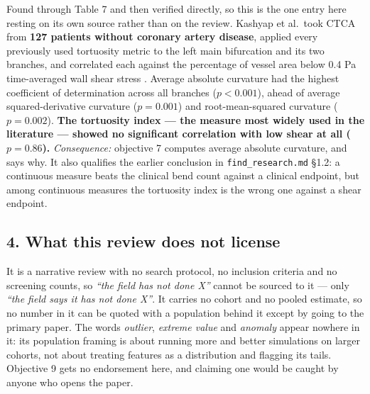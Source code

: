 Found through Table 7 and then verified directly, so this is the one entry here resting on its own
source rather than on the review. Kashyap et al.\ took CTCA from \textbf{127 patients without coronary
artery disease}, applied every previously used tortuosity metric to the left main bifurcation and
its two branches, and correlated each against the percentage of vessel area below 0.4 Pa
time-averaged wall shear stress \cite{kashyap2022tortuosity}.
Average absolute curvature had the highest coefficient of determination across all branches
($p < 0.001$), ahead of average squared-derivative curvature ($p = 0.001$) and root-mean-squared
curvature ($p = 0.002$).
\textbf{The tortuosity index --- the measure most widely used in the literature --- showed no
significant correlation with low shear at all ($p = 0.86$).}
\textit{Consequence:} objective 7 computes average absolute curvature, and says why. It also
qualifies the earlier conclusion in \texttt{find\_research.md} \S1.2: a continuous measure beats the
clinical bend count against a clinical endpoint, but among continuous measures the tortuosity index
is the wrong one against a shear endpoint.

\subsection*{4. What this review does not license}

It is a narrative review with no search protocol, no inclusion criteria and no screening counts, so
\emph{``the field has not done X''} cannot be sourced to it --- only \emph{``the field says it has
not done X''}.
It carries no cohort and no pooled estimate, so no number in it can be quoted with a population
behind it except by going to the primary paper.
The words \emph{outlier}, \emph{extreme value} and \emph{anomaly} appear nowhere in it: its
population framing is about running more and better simulations on larger cohorts, not about
treating features as a distribution and flagging its tails. Objective 9 gets no endorsement here,
and claiming one would be caught by anyone who opens the paper.
